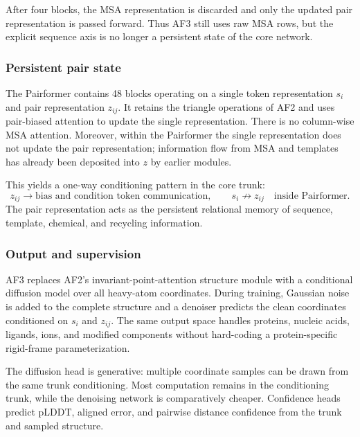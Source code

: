 \documentclass[10pt]{article}
\begin{document}
After four blocks, the MSA representation is discarded and only the updated pair representation
is passed forward.  Thus AF3 still uses raw MSA rows, but the explicit sequence axis is no longer a
persistent state of the core network.

\subsubsection{Persistent pair state}

The Pairformer contains 48 blocks operating on a single token representation $s_i$ and pair
representation $z_{ij}$.  It retains the triangle operations of AF2 and uses pair-biased attention
to update the single representation.  There is no column-wise MSA attention.  Moreover, within
the Pairformer the single representation does not update the pair representation; information
flow from MSA and templates has already been deposited into $z$ by earlier modules.

This yields a one-way conditioning pattern in the core trunk:
\begin{equation}
z_{ij}
\longrightarrow
\text{bias and condition token communication},
\qquad
s_i\not\longrightarrow z_{ij}
\quad\text{inside Pairformer}.
\label{eq:pairformer-flow}
\end{equation}
The pair representation acts as the persistent relational memory of sequence, template, chemical,
and recycling information.

\subsubsection{Output and supervision}

AF3 replaces AF2's invariant-point-attention structure module with a conditional diffusion model
over all heavy-atom coordinates.  During training, Gaussian noise is added to the complete
structure and a denoiser predicts the clean coordinates conditioned on $s_i$ and $z_{ij}$.  The
same output space handles proteins, nucleic acids, ligands, ions, and modified components without
hard-coding a protein-specific rigid-frame parameterization.

The diffusion head is generative: multiple coordinate samples can be drawn from the same trunk
conditioning.  Most computation remains in the conditioning trunk, while the denoising network is
comparatively cheaper.  Confidence heads predict pLDDT, aligned error, and pairwise distance
confidence from the trunk and sampled structure.
\end{document}
